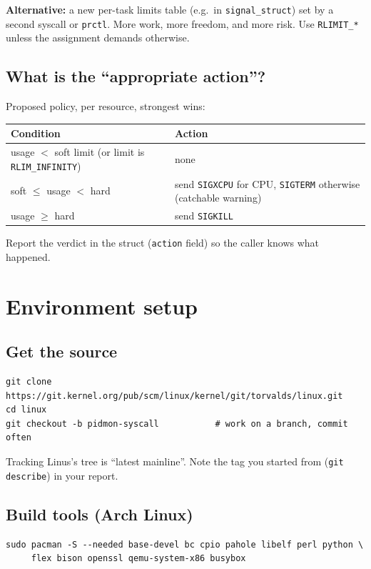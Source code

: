 \documentclass[11pt,a4paper]{article}
\begin{document}
\begin{decision}
\textbf{Alternative:} a new per-task limits table (e.g.\ in \texttt{signal\_struct}) set by a second syscall or \texttt{prctl}. More work, more freedom, and more risk. Use \texttt{RLIMIT\_*} unless the assignment demands otherwise.
\end{decision}

\subsection{What is the ``appropriate action''?}
Proposed policy, per resource, strongest wins:

\begin{center}\small
\begin{tabular}{@{}ll@{}}
\toprule
Condition & Action \\
\midrule
usage $<$ soft limit (or limit is \texttt{RLIM\_INFINITY}) & none \\
soft $\le$ usage $<$ hard & send \texttt{SIGXCPU} for CPU, \texttt{SIGTERM} otherwise (catchable warning) \\
usage $\ge$ hard & send \texttt{SIGKILL} \\
\bottomrule
\end{tabular}
\end{center}
Report the verdict in the struct (\texttt{action} field) so the caller knows what happened.

\section{Environment setup}
\subsection{Get the source}
\begin{lstlisting}[style=sh]
git clone https://git.kernel.org/pub/scm/linux/kernel/git/torvalds/linux.git
cd linux
git checkout -b pidmon-syscall           # work on a branch, commit often
\end{lstlisting}
Tracking Linus's tree is ``latest mainline''. Note the tag you started from (\texttt{git describe}) in your report.

\subsection{Build tools (Arch Linux)}
\begin{lstlisting}[style=sh]
sudo pacman -S --needed base-devel bc cpio pahole libelf perl python \
     flex bison openssl qemu-system-x86 busybox
\end{lstlisting}
\end{document}
